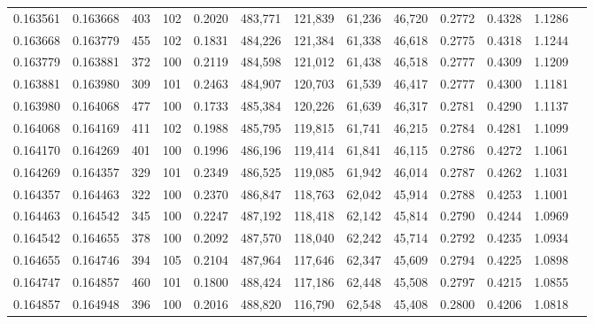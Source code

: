 \begin{tabular}{rrrrrrrrrrrrr}
0.163561 & 0.163668 &   403 & 102 &                                     0.2020 & 483,771 & 121,839 &  61,236 &  46,720 & 0.2772 & 0.4328 & 1.1286 \\
0.163668 & 0.163779 &   455 & 102 &                                     0.1831 & 484,226 & 121,384 &  61,338 &  46,618 & 0.2775 & 0.4318 & 1.1244 \\
0.163779 & 0.163881 &   372 & 100 &                                     0.2119 & 484,598 & 121,012 &  61,438 &  46,518 & 0.2777 & 0.4309 & 1.1209 \\
0.163881 & 0.163980 &   309 & 101 &                                     0.2463 & 484,907 & 120,703 &  61,539 &  46,417 & 0.2777 & 0.4300 & 1.1181 \\
0.163980 & 0.164068 &   477 & 100 &                                     0.1733 & 485,384 & 120,226 &  61,639 &  46,317 & 0.2781 & 0.4290 & 1.1137 \\
0.164068 & 0.164169 &   411 & 102 &                                     0.1988 & 485,795 & 119,815 &  61,741 &  46,215 & 0.2784 & 0.4281 & 1.1099 \\
0.164170 & 0.164269 &   401 & 100 &                                     0.1996 & 486,196 & 119,414 &  61,841 &  46,115 & 0.2786 & 0.4272 & 1.1061 \\
0.164269 & 0.164357 &   329 & 101 &                                     0.2349 & 486,525 & 119,085 &  61,942 &  46,014 & 0.2787 & 0.4262 & 1.1031 \\
0.164357 & 0.164463 &   322 & 100 &                                     0.2370 & 486,847 & 118,763 &  62,042 &  45,914 & 0.2788 & 0.4253 & 1.1001 \\
0.164463 & 0.164542 &   345 & 100 &                                     0.2247 & 487,192 & 118,418 &  62,142 &  45,814 & 0.2790 & 0.4244 & 1.0969 \\
0.164542 & 0.164655 &   378 & 100 &                                     0.2092 & 487,570 & 118,040 &  62,242 &  45,714 & 0.2792 & 0.4235 & 1.0934 \\
0.164655 & 0.164746 &   394 & 105 &                                     0.2104 & 487,964 & 117,646 &  62,347 &  45,609 & 0.2794 & 0.4225 & 1.0898 \\
0.164747 & 0.164857 &   460 & 101 &                                     0.1800 & 488,424 & 117,186 &  62,448 &  45,508 & 0.2797 & 0.4215 & 1.0855 \\
0.164857 & 0.164948 &   396 & 100 &                                     0.2016 & 488,820 & 116,790 &  62,548 &  45,408 & 0.2800 & 0.4206 & 1.0818 \\

\end{tabular}
